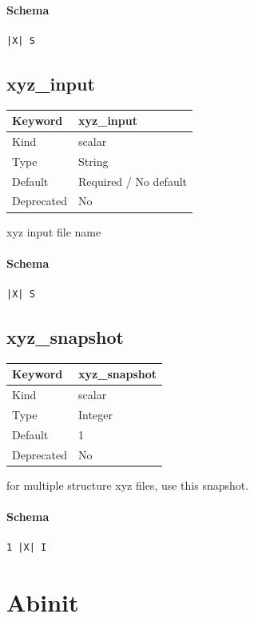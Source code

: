 \documentclass[11pt]{article}
\begin{document}
\paragraph{Schema}
\begin{Verbatim}
|X| S
\end{Verbatim}

\subsection{xyz\_input}
\label{kw:xyz-input}
\begin{longtable}{|p{1.5in}|p{4.5in}|}
\hline
Keyword & xyz\_input \\
\hline
Kind & scalar \\
\hline
Type & String \\
\hline
Default & Required / No default \\
\hline
Deprecated & No \\
\hline
\end{longtable}
 xyz input file name

\paragraph{Schema}
\begin{Verbatim}
|X| S
\end{Verbatim}

\subsection{xyz\_snapshot}
\label{kw:xyz-snapshot}
\begin{longtable}{|p{1.5in}|p{4.5in}|}
\hline
Keyword & xyz\_snapshot \\
\hline
Kind & scalar \\
\hline
Type & Integer \\
\hline
Default & 1 \\
\hline
Deprecated & No \\
\hline
\end{longtable}
 for multiple structure xyz files, use this snapshot.

\paragraph{Schema}
\begin{Verbatim}
1 |X| I
\end{Verbatim}

\section{Abinit}
\end{document}
